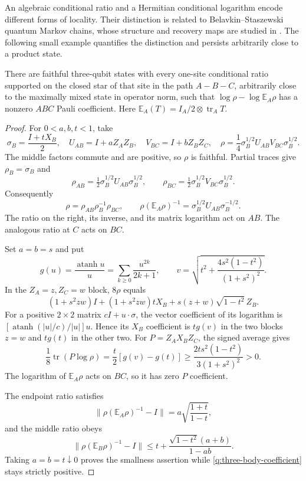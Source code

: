 An algebraic conditional ratio and a Hermitian conditional logarithm
encode different forms of locality.  Their distinction is related to
Belavkin--Staszewski quantum Markov chains, whose structure and recovery
maps are studied in \cite{q:BCCRJ2026}.  The following small example
quantifies the distinction and persists arbitrarily close to a product
state.

\begin{proposition}
\label{q:prop-ratio-obstruction}
There are faithful three-qubit states with every one-site conditional
ratio supported on the closed star of that site in the path $A-B-C$,
arbitrarily close to the maximally mixed state in operator norm, such that
$\log\rho-\log\mathbb E_A\rho$ has a nonzero $ABC$ Pauli coefficient.
Here $\mathbb E_A(T)=I_A/2\otimes\operatorname{tr}_A T$.
\end{proposition}

\begin{proof}
For $0<a,b,t<1$, take
\[
 \sigma_B=\frac{I+tX_B}{2},\quad
 U_{AB}=I+aZ_AZ_B,\quad V_{BC}=I+bZ_BZ_C,
 \quad
 \rho=\frac14\sigma_B^{1/2}U_{AB}V_{BC}\sigma_B^{1/2}.
\]
The middle factors commute and are positive, so $\rho$ is faithful.
Partial traces give $\rho_B=\sigma_B$ and
\[
 \rho_{AB}=\tfrac12\sigma_B^{1/2}U_{AB}\sigma_B^{1/2},\qquad
 \rho_{BC}=\tfrac12\sigma_B^{1/2}V_{BC}\sigma_B^{1/2}.
\]
Consequently
\begin{equation}
 \rho=\rho_{AB}\rho_B^{-1}\rho_{BC},\qquad
 \rho(\mathbb E_A\rho)^{-1}
       =\sigma_B^{1/2}U_{AB}\sigma_B^{-1/2}.
 \label{q:bs-recovery}
\end{equation}
The ratio on the right, its inverse, and its matrix logarithm act on
$AB$.  The analogous ratio at $C$ acts on $BC$.

Set $a=b=s$ and put
\[
 g(u)=\frac{\operatorname{atanh}u}{u}
      =\sum_{k\geq0}\frac{u^{2k}}{2k+1},\qquad
 v=\sqrt{t^2+\frac{4s^2(1-t^2)}{(1+s^2)^2}}.
\]
In the $Z_A=z,Z_C=w$ block, $8\rho$ equals
\[
 (1+s^2zw)I+(1+s^2zw)tX_B
           +s(z+w)\sqrt{1-t^2}\,Z_B.
\]
For a positive $2\times2$ matrix $cI+u\cdot\sigma$, the vector
coefficient of its logarithm is
$[\operatorname{atanh}(|u|/c)/|u|]u$.  Hence its $X_B$ coefficient is
$tg(v)$ in the two blocks $z=w$ and $tg(t)$ in the other two.  For
$P=Z_AX_BZ_C$, the signed average gives
\begin{equation}
 \frac18\operatorname{tr}(P\log\rho)
 =\frac t2[g(v)-g(t)]
 \geq\frac{2ts^2(1-t^2)}{3(1+s^2)^2}>0.
 \label{q:three-body-coefficient}
\end{equation}
The logarithm of $\mathbb E_A\rho$ acts on $BC$, so it has zero
$P$ coefficient.

The endpoint ratio satisfies
\[
 \|\rho(\mathbb E_A\rho)^{-1}-I\|
 =a\sqrt{\frac{1+t}{1-t}},
\]
and the middle ratio obeys
\[
 \|\rho(\mathbb E_B\rho)^{-1}-I\|
 \leq t+\frac{\sqrt{1-t^2}(a+b)}{1-ab}.
\]
Taking $a=b=t\downarrow0$ proves the smallness assertion while
\eqref{q:three-body-coefficient} stays strictly positive.
\end{proof}

